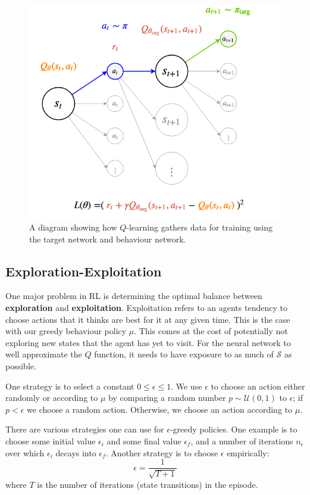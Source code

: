 \documentclass[journal, onecolumn, 12pt, draftclsnofoot]{IEEEtran}
\numberwithin{equation}{section}
\newcommand{\kword}[1]{\textbf{#1}}
\newcommand{\mc}[1]{\mathcal{#1}}
\begin{document}
		\begin{figure}[ht]
			\centering
			\includegraphics[scale=0.5]{fig/state-transition-q-learning-loss-target-networks.png}
			\caption{A diagram showing how $Q$-learning gathers data for training using the target network and behaviour network.}
			\label{fig:state-transition-q-learning-loss-target-networks}
		\end{figure}
		\subsection{Exploration-Exploitation}
		\par One major problem in RL is determining the optimal balance between \kword{exploration} and \kword{exploitation}. Exploitation refers to an agents tendency to choose actions that it thinks are best for it at any given time. This is the case with our greedy behaviour policy $\mu$. This comes at the cost of potentially not exploring new states that the agent has yet to visit. For the neural network to well approximate the $Q$ function, it needs to have exposure to as much of $\mc{S}$ as possible.
		\par One strategy is to select a constant $0 \leq \epsilon \leq 1$. We use $\epsilon$ to choose an action either randomly or according to $\mu$ by comparing a random number $p \sim \mc{U}(0,1)$ to $\epsilon$; if $p < \epsilon$ we choose a random action. Otherwise, we choose an action according to $\mu$.
		\par There are various strategies one can use for $\epsilon$-greedy policies. One example is to choose some initial value $\epsilon_i$ and some final value $\epsilon_f$, and a number of iterations $n_\epsilon$ over which $\epsilon_i$ decays into $\epsilon_f$. Another strategy is to choose $\epsilon$ empirically:
		$$\epsilon = \frac{1}{\sqrt{T+1}}$$
		where $T$ is the number of iterations (state transitions) in the episode.
\end{document}
